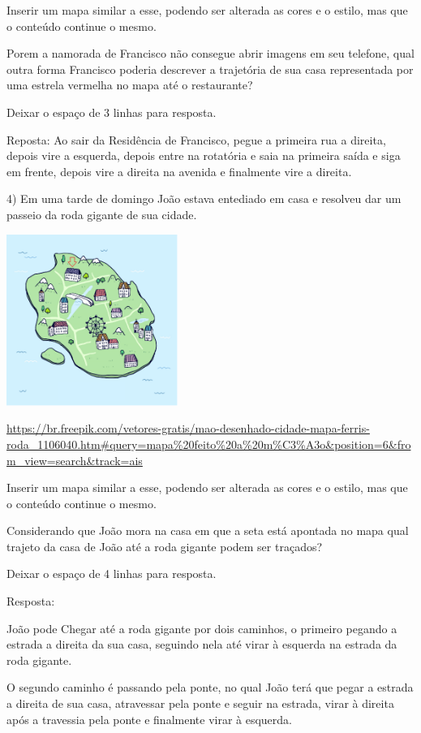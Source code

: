 Inserir um mapa similar a esse, podendo ser alterada as cores e o
estilo, mas que o conteúdo continue o mesmo.

Porem a namorada de Francisco não consegue abrir imagens em seu
telefone, qual outra forma Francisco poderia descrever a trajetória de
sua casa representada por uma estrela vermelha no mapa até o
restaurante?

Deixar o espaço de 3 linhas para resposta.

Reposta: Ao sair da Residência de Francisco, pegue a primeira rua a
direita, depois vire a esquerda, depois entre na rotatória e saia na
primeira saída e siga em frente, depois vire a direita na avenida e
finalmente vire a direita.

4) Em uma tarde de domingo João estava entediado em casa e resolveu dar
um passeio da roda gigante de sua cidade.

\includegraphics[width=2.2in,height=2.2in]{./imgSAEB_8_MAT/media/image38.png}

\url{https://br.freepik.com/vetores-gratis/mao-desenhado-cidade-mapa-ferris-roda_1106040.htm\#query=mapa\%20feito\%20a\%20m\%C3\%A3o\&position=6\&from_view=search\&track=ais}

Inserir um mapa similar a esse, podendo ser alterada as cores e o
estilo, mas que o conteúdo continue o mesmo.

Considerando que João mora na casa em que a seta está apontada no mapa
qual trajeto da casa de João até a roda gigante podem ser traçados?

Deixar o espaço de 4 linhas para resposta.

Resposta:

João pode Chegar até a roda gigante por dois caminhos, o primeiro
pegando a estrada a direita da sua casa, seguindo nela até virar à
esquerda na estrada da roda gigante.

O segundo caminho é passando pela ponte, no qual João terá que pegar a
estrada a direita de sua casa, atravessar pela ponte e seguir na
estrada, virar à direita após a travessia pela ponte e finalmente virar
à esquerda.

